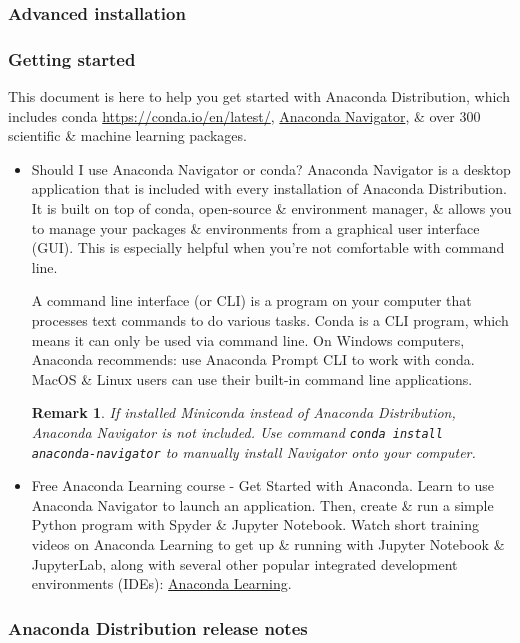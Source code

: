 \documentclass{article}
\newtheorem{remark}{Remark}
\begin{document}
\subsubsection{Advanced installation}

\subsubsection{Getting started}
This document is here to help you get started with Anaconda Distribution, which includes conda \url{https://conda.io/en/latest/}, \href{https://docs.anaconda.com/navigator/}{Anaconda Navigator}, \& over 300 scientific \& machine learning packages.
\begin{itemize}
	\item {\sf Should I use Anaconda Navigator or conda?} Anaconda Navigator is a desktop application that is included with every installation of Anaconda Distribution. It is built on top of conda, open-source \& environment manager, \& allows you to manage your packages \& environments from a graphical user interface (GUI). This is especially helpful when you're not comfortable with command line.
	
	A command line interface (or CLI) is a program on your computer that processes text commands to do various tasks. Conda is a CLI program, which means it can only be used via command line. On Windows computers, Anaconda recommends: use Anaconda Prompt CLI to work with conda. MacOS \& Linux users can use their built-in command line applications.
	\begin{remark}
		If installed Miniconda instead of Anaconda Distribution, Anaconda Navigator is not included. Use command {\tt conda install anaconda-navigator} to manually install Navigator onto your computer.
	\end{remark}
	\item {\sf Free Anaconda Learning course - Get Started with Anaconda.} Learn to use Anaconda Navigator to launch an application. Then, create \& run a simple Python program with Spyder \& Jupyter Notebook. Watch short training videos on Anaconda Learning to get up \& running with Jupyter Notebook \& JupyterLab, along with several other popular integrated development environments (IDEs): \href{https://learning.anaconda.cloud/get-started-with-anaconda?utm_campaign=learning&utm_medium=documentation&utm_source=anacondadocs&utm_content=getstartedbutton}{Anaconda Learning}.
\end{itemize}

\subsubsection{Anaconda Distribution release notes}
\end{document}
